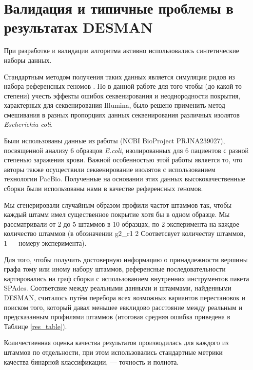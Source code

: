 \documentclass{spbau-diploma}
\begin{document}
\section{Валидация и типичные проблемы в результатах DESMAN}

При разработке и валидации алгоритма активно использовались синтетические наборы данных. 

Стандартным методом получения таких данных является симуляция ридов из набора референсных геномов \cite{DESMAN, CONCOCT}.
Но в данной работе для того чтобы (до какой-то степени) учесть эффекты ошибок секвенирования и неоднородности покрытия, характерных для секвенирования Illumina, было решено применить метод смешивания в разных пропорциях данных секвенирования различных изолятов \textit{Escherichia coli}. 

Были использованы данные из работы \cite{isolates} (NCBI BioProject PRJNA239027), посвященной анализу 6 образцов \textit{E.coli}, изолированных для 6 пациентов с разной степенью заражения крови. 
Важной особенностью этой работы является то, что авторы также осуществили секвенирование изолятов с использованием технологии PacBio. 
Полученные на основании этих данных высококачественные сборки были использованы нами в качестве референсных геномов.

Мы сгенерировали случайным образом профили частот штаммов так, чтобы каждый штамм имел существенное покрытие хотя бы в одном образце. Мы рассматривали от 2 до 5 штаммов в 10 образцах, по 2 эксперимента на каждое количество штаммов (в обозначении g2\_r1 2 Соответсвует количеству штаммов, 1 --- номеру эксперимента).%

Для того, чтобы получить достоверную информацию о принадлежности вершины графа тому или иному набору штаммов, референсные последовательности картировались на граф сборки с использованием внутренних инструментов пакета SPAdes. Соответсвие между реальными данными и штаммами, найденными DESMAN, считалось путём перебора всех возможных вариантов перестановок и поиском того, который давал меньшее евклидово расстояние между реальным и предсказанным профилями штаммов (итоговая средняя ошибка приведена в Таблице \ref{res_table}).

Количественная оценка качества результатов производилась для каждого из штаммов по отдельности, при этом использовались стандартные метрики качества бинарной классификации, --- точность и полнота.
\end{document}
